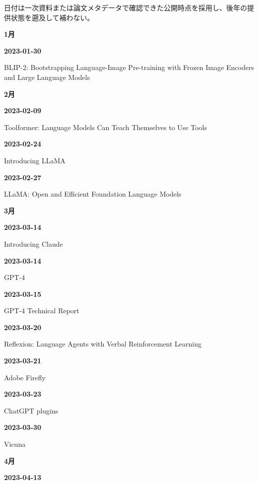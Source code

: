 \noindent 日付は一次資料または論文メタデータで確認できた公開時点を採用し、後年の提供状態を遡及して補わない。
\par\medskip
\medskip
\noindent\textbf{1月}\par
\smallskip
\noindent\textbf{2023-01-30}\par
{\raggedright BLIP-2: Bootstrapping Language-Image Pre-training with Frozen Image Encoders and Large Language Models\par}
\smallskip
\medskip
\noindent\textbf{2月}\par
\smallskip
\noindent\textbf{2023-02-09}\par
{\raggedright Toolformer: Language Models Can Teach Themselves to Use Tools\par}
\smallskip
\noindent\textbf{2023-02-24}\par
{\raggedright Introducing LLaMA\par}
\smallskip
\noindent\textbf{2023-02-27}\par
{\raggedright LLaMA: Open and Efficient Foundation Language Models\par}
\smallskip
\medskip
\noindent\textbf{3月}\par
\smallskip
\noindent\textbf{2023-03-14}\par
{\raggedright Introducing Claude\par}
\smallskip
\noindent\textbf{2023-03-14}\par
{\raggedright GPT-4\par}
\smallskip
\noindent\textbf{2023-03-15}\par
{\raggedright GPT-4 Technical Report\par}
\smallskip
\noindent\textbf{2023-03-20}\par
{\raggedright Reflexion: Language Agents with Verbal Reinforcement Learning\par}
\smallskip
\noindent\textbf{2023-03-21}\par
{\raggedright Adobe Firefly\par}
\smallskip
\noindent\textbf{2023-03-23}\par
{\raggedright ChatGPT plugins\par}
\smallskip
\noindent\textbf{2023-03-30}\par
{\raggedright Vicuna\par}
\smallskip
\medskip
\noindent\textbf{4月}\par
\smallskip
\noindent\textbf{2023-04-13}\par
